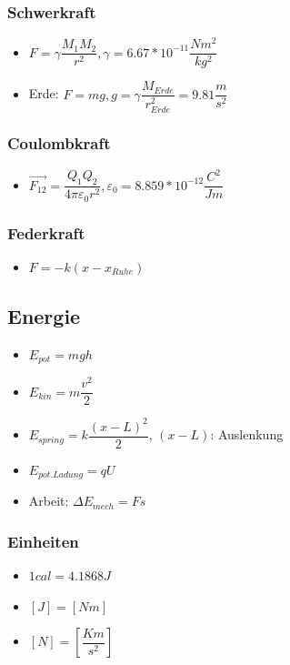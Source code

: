 \documentclass[8pt,a4paper]{scrartcl}
\begin{document}
\begin{multicols*}{3}
				\subsubsection{Schwerkraft}
					\begin{itemize}\itemsep0pt				
						\item $F=\gamma\dfrac{M_{1}M_{2}}{r^{2}}, \gamma = 6.67*10^{-11}\dfrac{Nm^{2}}{kg^{2}}$
						\item Erde: $F =mg, g = \gamma\dfrac{M_{Erde}}{r_{Erde}^{2}}=9.81\dfrac{m}{s^{2}}$
					\end{itemize}
				\subsubsection{Coulombkraft}
					\begin{itemize}\itemsep0pt				
						\item $\overrightarrow{F_{12}}=\dfrac{Q_{1}Q_{2}}{4\pi\varepsilon_{0}r^{2}}, \varepsilon_{0}=8.859*10^{-12}\dfrac{C^{2}}{Jm}$
					\end{itemize}
				\subsubsection{Federkraft}
					\begin{itemize}\itemsep0pt				
						\item $F = -k(x-x_{Ruhe})$
					\end{itemize}
			
		\subsection{Energie}
			\begin{itemize}\itemsep0pt				
				\item $E_{pot}=mgh$
				\item $E_{kin}=m\dfrac{v^{2}}{2}$
				\item $E_{spring}=k\dfrac{(x-L)^{2}}{2}$, $(x-L)$: Auslenkung
				\item $E_{pot. Ladung}=qU$
				\item Arbeit: $\Delta E_{mech}=Fs$			
			\end{itemize}
			\subsubsection{Einheiten}		
			\begin{itemize}\itemsep0pt		
				\item $1 cal = 4.1868 J$		
				\item $[J]=[Nm]$
				\item $[N]=[\dfrac{Km}{s^{2}}]$
			\end{itemize}


\end{multicols*}
\end{document}
